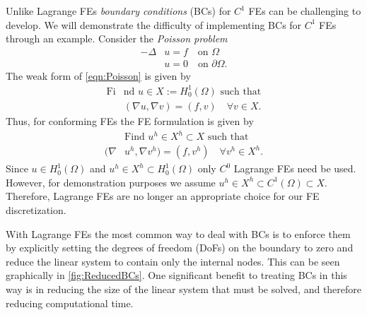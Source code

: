 Unlike Lagrange FEs \emph{boundary conditions} (BCs) for $C^1$ FEs can be
challenging to develop. We will demonstrate the difficulty of implementing BCs for
$C^1$ FEs through an example. Consider the \emph{Poisson problem}
\begin{equation}
  \begin{split}
    -\Delta &u = f \quad \text{on } \Omega \\
    &u = 0 \quad \text{on } \partial \Omega.
  \end{split}
  \label{eqn:Poisson}
\end{equation}
The weak form of \eqref{eqn:Poisson} is given by
\begin{equation}
  \begin{split}
    \text{Fi}&\text{nd }u \in X := H^1_0(\Omega) \text{ such that} \\
    &(\nabla u, \nabla v) = (f, v) \quad \forall v \in X.
  \end{split}
  \label{eqn:PoissonWeak}
\end{equation}
Thus, for conforming FEs the FE formulation is given by
\begin{equation}
  \begin{split}
    &\text{Find }u^h \in X^h \subset X \text{ such that} \\
    (\nabla &u^h, \nabla v^h) = (f, v^h) \quad \forall v^h \in X^h.
  \end{split}
  \label{eqn:PoissonFE}
\end{equation}
Since $u \in H^1_0(\Omega)$ and $u^h \in X^h \subset H^1_0(\Omega)$ only $C^0$
Lagrange FEs need be used. However, for demonstration purposes we assume $u^h
\in X^h \subset C^1(\Omega) \subset X$. Therefore, Lagrange FEs are no longer
an appropriate choice for our FE discretization.

With Lagrange FEs the most common way to deal with BCs is to enforce them by
explicitly setting the degrees of freedom (DoFs) on the boundary to zero and
reduce the linear system to contain only the internal nodes. This can be seen
graphically in \autoref{fig:ReducedBCs}. One significant benefit to treating BCs in
this way is in reducing the size of the linear system that must be solved, and
therefore reducing computational time.



